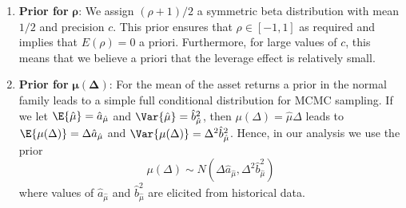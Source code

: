 \begin{enumerate}
\item \textbf{Prior for } $\boldsymbol{\rho}$: We assign $(\rho + 1)/2$ a symmetric beta distribution with mean $1/2$ and precision $c$.  This prior ensures that $\rho \in [-1,1]$ as required and implies that $E(\rho) = 0$ a priori.  Furthermore, for large values of $c$, this means that we believe a priori that the  leverage effect is relatively small.


\item \textbf{Prior for } $\boldsymbol{\mu}(\boldsymbol{\Delta})$: For the mean of the asset returns a prior in the normal family leads to a simple full conditional distribution for MCMC sampling.  If we let $\E{ \hat{\mu} } = \hat{a}_{\hat{\mu}}$ and $\Var{ \hat{\mu} } = \hat{b}^2_{\hat{\mu}}$, then $\mu(\Delta) = \hat{\mu} \Delta$ leads to $\E{ \mu(\Delta) } = \Delta \hat{a}_{\hat{\mu}}$ and $\Var{ \mu(\Delta) } = \Delta^2 \hat{b}^2_{\hat{\mu}}$.  Hence, in our analysis we use the prior
$$
\mu(\Delta) \sim N(\Delta \hat{a}_{\hat{\mu}}, \Delta^2 \hat{b}^2_{\hat{\mu}})
$$
where values of $\hat{a}_{\hat{\mu}}$ and $\hat{b}^2_{\hat{\mu}}$ are elicited from historical data.



\end{enumerate}
